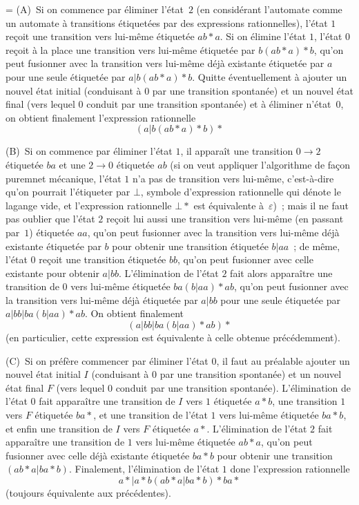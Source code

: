 \documentclass[12pt,a4paper]{article}
\theoremstyle{definition}
\newif\ifcorrige
\newenvironment{corrige}%
{\ifcorrige\relax\else\setbox0=\vbox\bgroup\fi%
\smallbreak\footnotesize\noindent{\underbar{\textit{Corrigé.}}\quad}}
{{\hbox{}\nobreak\hfill\checkmark}%
\ifcorrige\relax\else\egroup\fi\par}
\begin{document}
\begin{corrige}
(A) Si on commence par éliminer l'état $2$ (en considérant l'automate
comme un automate à transitions étiquetées par des expressions
rationnelles), l'état $1$ reçoit une transition vers lui-même
étiquetée $ab{*}a$.  Si on élimine l'état $1$, l'état $0$ reçoit à la
place une transition vers lui-même étiquetée par $b(ab{*}a){*}b$,
qu'on peut fusionner avec la transition vers lui-même déjà existante
étiquetée par $a$ pour une seule étiquetée par $a|b(ab{*}a){*}b$.
Quitte éventuellement à ajouter un nouvel état initial (conduisant à
$0$ par une transition spontanée) et un nouvel état final (vers lequel
$0$ conduit par une transition spontanée) et à éliminer n'état $0$, on
obtient finalement l'expression rationnelle
\[
(a|b(ab{*}a){*}b){*}
\]

\smallbreak

(B) Si on commence par éliminer l'état $1$, il apparaît une transition
$0\to 2$ étiquetée $ba$ et une $2\to 0$ étiquetée $ab$ (si on veut
appliquer l'algorithme de façon puremnet mécanique, l'état $1$ n'a pas
de transition vers lui-même, c'est-à-dire qu'on pourrait l'étiqueter
par $\bot$, symbole d'expression rationnelle qui dénote le lagange
vide, et l'expression rationnelle $\bot{*}$ est équivalente
à $\varepsilon$) ; mais il ne faut pas oublier que l'état $2$ reçoit
lui aussi une transition vers lui-même (en passant par $1$) étiquetée
$aa$, qu'on peut fusionner avec la transition vers lui-même déjà
existante étiquetée par $b$ pour obtenir une transition étiquetée
$b|aa$ ; de même, l'état $0$ reçoit une transition étiquetée $bb$,
qu'on peut fusionner avec celle existante pour obtenir $a|bb$.
L'élimination de l'état $2$ fait alors apparaître une transition de
$0$ vers lui-même étiquetée $ba(b|aa){*}ab$, qu'on peut fusionner avec
la transition vers lui-même déjà étiquetée par $a|bb$ pour une seule
étiquetée par $a|bb|ba(b|aa){*}ab$.  On obtient finalement
\[
(a|bb|ba(b|aa){*}ab){*}
\]
(en particulier, cette expression est équivalente à celle obtenue
précédemment).

\smallbreak

(C) Si on préfère commencer par éliminer l'état $0$, il faut au préalable
ajouter un nouvel état initial $I$ (conduisant à $0$ par une
transition spontanée) et un nouvel état final $F$ (vers lequel $0$
conduit par une transition spontanée).  L'élimination de l'état $0$
fait apparaître une transition de $I$ vers $1$ étiquetée $a{*}b$, une
transition $1$ vers $F$ étiquetée $ba{*}$, et une transition de l'état
$1$ vers lui-même étiquetée $ba{*}b$, et enfin une transition de $I$
vers $F$ étiquetée $a{*}$.  L'élimination de l'état $2$ fait
apparaître une transition de $1$ vers lui-même étiquetée $ab{*}a$,
qu'on peut fusionner avec celle déjà existante étiquetée $ba{*}b$ pour
obtenir une transition $(ab{*}a|ba{*}b)$.  Finalement, l'élimination
de l'état $1$ done l'expression rationnelle
\[
a{*}|a{*}b(ab{*}a|ba{*}b){*}ba{*}
\]
(toujours équivalente aux précédentes).
\end{corrige}
\end{document}
